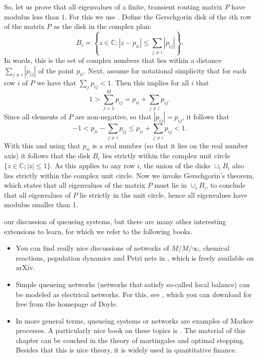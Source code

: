 So, let us prove that all eigenvalues of a finite, transient routing matrix $P$ have modulus less than $1$.
For this we use .
Define the Gerschgorin disk of the $i$th row of the matrix $P$ as the disk in the complex plan:
\begin{equation*}
B_i=\left\{z\in \mathbb{C};  |z-p_{ii}|\leq \sum_{j\neq i} |p_{i j}| \right\}.
\end{equation*}
In words, this is the set of complex numbers that lies within a distance $\sum_{j\neq i} |p_{i j}|$ of the point $p_{i i}$.
Next, assume for notational simplicity that for each row $i$ of $P$ we have that $\sum_{j} p_{i j}<1$.
Then this implies for all $i$ that
\begin{equation*}
1> \sum_{j=1}^M p_{i j} =  p_{ii} + \sum_{j\neq i} p_{i j}.
\end{equation*}
Since all elements of $P$ are non-negative, so that $|p_{i j}| = p_{i j }$, it follows that
\begin{equation*}
-1 < p_{ii} - \sum_{j\neq i} p_{i j} \leq p_{ii} + \sum_{j\neq i} p_{i j} < 1.
\end{equation*}
With this and using that $p_{ii}$ is a real number (so that it lies on the real number axis) it follows that the disk $B_i $ lies strictly within the complex unit circle $\{z \in \mathbb{C}; |z|\leq 1\}$.
As this applies to any row $i$, the union of the disks $\cup_{i} B_{i}$ also lies strictly within the complex unit circle.
Now we invoke Gerschgorin's theorem, which states that all eigenvalues of the matrix $P$ must lie in $\cup_i B_i$, to conclude that all eigenvalues of $P$ lie strictly in the unit circle, hence all eigenvalues have modulus smaller than 1.


 our discussion of queueing systems, but there are many other interesting extensions to learn, for which we refer to the following books.
\begin{itemize}
\item You can find really nice discussions of networks of $M/M/\infty$, chemical reactions, population dynamics and Petri nets in \cite{baez2012quantum}, which is freely available on arXiv.
\item Simple queueing networks (networks that satisfy so-called local balance) can be modeled as electrical networks.
  For this, see \cite{doyle84:_random_walks_elect_networ}, which you can download for free from the homepage of Doyle.
\item In more general terms, queueing systems or networks are examples of Markov processes.
  A particularly nice book on these topics is \cite{norris97:_markov_chain}.
  The material of this chapter can be couched in the theory of martingales and optimal stopping.
  Besides that this is nice theory, it is widely used in quantitative finance.
\end{itemize}


